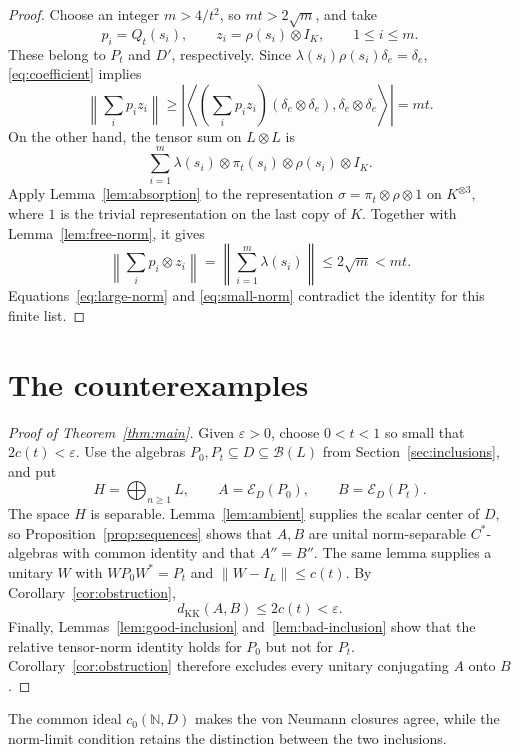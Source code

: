 \documentclass[11pt]{article}
\theoremstyle{definition}
\theoremstyle{remark}
\newcommand{\N}{\mathbb N}
\newcommand{\B}{\mathcal B}
\newcommand{\E}{\mathcal E}
\newcommand{\KK}{d_{\mathrm{KK}}}
\newcommand{\id}{I}
\newcommand{\norm}[1]{\left\|#1\right\|}
\newcommand{\inner}[2]{\left\langle #1,#2\right\rangle}
\begin{document}
\begin{proof}
Choose an integer $m>4/t^2$, so $mt>2\sqrt m$, and take
\[
p_i=Q_t(s_i),\qquad z_i=\rho(s_i)\otimes\id_K,
\qquad 1\le i\le m.
\]
These belong to $P_t$ and $D'$, respectively. Since
$\lambda(s_i)\rho(s_i)\delta_e=\delta_e$, \eqref{eq:coefficient} implies
\begin{equation}\label{eq:large-norm}
\norm{\sum_i p_i z_i}
\ge\left|\inner{\left(\sum_i p_i z_i\right)
(\delta_e\otimes\delta_e)}{\delta_e\otimes\delta_e}\right|
=mt.
\end{equation}
On the other hand, the tensor sum on $L\otimes L$ is
\[
\sum_{i=1}^m\lambda(s_i)\otimes\pi_t(s_i)
\otimes\rho(s_i)\otimes\id_K.
\]
Apply Lemma~\ref{lem:absorption} to the representation
$\sigma=\pi_t\otimes\rho\otimes1$ on $K^{\otimes3}$, where $1$ is the
trivial representation on the last copy of $K$. Together with
Lemma~\ref{lem:free-norm}, it gives
\begin{equation}\label{eq:small-norm}
\norm{\sum_i p_i\otimes z_i}
=\norm{\sum_{i=1}^m\lambda(s_i)}\le2\sqrt m<mt.
\end{equation}
Equations~\eqref{eq:large-norm} and \eqref{eq:small-norm} contradict the
identity for this finite list.
\end{proof}

\section{The counterexamples}\label{sec:assembly}

\begin{proof}[Proof of Theorem~\ref{thm:main}]
Given $\varepsilon>0$, choose $0<t<1$ so small that $2c(t)<\varepsilon$.
Use the algebras $P_0,P_t\subseteq D\subseteq\B(L)$ from
Section~\ref{sec:inclusions}, and put
\[
H=\bigoplus_{n\ge1}L,\qquad A=\E_D(P_0),\qquad B=\E_D(P_t).
\]
The space $H$ is separable. Lemma~\ref{lem:ambient} supplies the scalar
center of $D$, so Proposition~\ref{prop:sequences} shows that $A,B$ are
unital norm-separable $C^*$-algebras with common identity and that
$A''=B''$. The same lemma supplies a unitary $W$ with
$WP_0W^*=P_t$ and $\norm{W-\id_L}\le c(t)$. By
Corollary~\ref{cor:obstruction},
\[
\KK(A,B)\le2c(t)<\varepsilon.
\]
Finally, Lemmas~\ref{lem:good-inclusion} and~\ref{lem:bad-inclusion}
show that the relative tensor-norm identity holds for $P_0$ but not for
$P_t$. Corollary~\ref{cor:obstruction} therefore excludes every unitary
conjugating $A$ onto $B$.
\end{proof}

The common ideal $c_0(\N,D)$ makes the von Neumann closures agree,
while the norm-limit condition retains the distinction between the two
inclusions.


\end{document}

